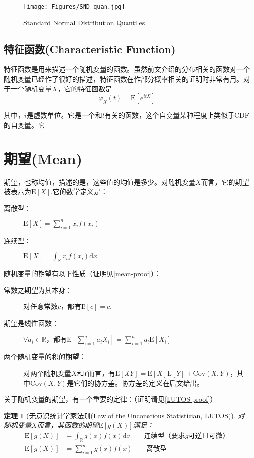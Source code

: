 \documentclass[UTF8]{ctexbook}
\newtheorem{theorem}{定理}[section] %
\begin{document}
\begin{figure}[ht]
	\centering
	\texttt{[image: Figures/SND\_quan.jpg]}
	\caption{Standard Normal Distribution Quantiles}
	\label{fig:StNor_quan}
\end{figure}

\newpage
\subsection{特征函数(Characteristic Function)}
\label{characteristic-function}
特征函数是用来描述一个随机变量的函数。虽然前文介绍的分布相关的函数对一个随机变量已经作了很好的描述，特征函数在作部分概率相关的证明时非常有用。对于一个随机变量$X$，它的特征函数是
\[
	\varphi_X(t)=\mathrm E[e^{itX}]
\]

其中，$i$是虚数单位。它是一个和$t$有关的函数，这个自变量某种程度上类似于CDF的自变量。它

\section{期望(Mean)}
\label{mean}
期望，也称均值，描述的是，这些值的均值是多少。对随机变量$X$而言，它的期望被表示为$\mathrm E[X]$.它的数学定义是：
\begin{description}
	\item [离散型：]
	$\mathrm E[X]=\sum_{i=1}^nx_if(x_i)$
	\item [连续型：]
	$\mathrm E[X]=\int_{\mathbb{R}}x_if(x_i)\mathrm dx$
\end{description}

随机变量的期望有以下性质（证明见\ref{mean-proof}）：
\begin{description}
	\item [常数之期望为其本身：]
	对任意常数$c$，都有$\mathrm E[c]=c$.
	\item [期望是线性函数：]
	$\forall a_i\in\mathbb{R}$，都有$\mathrm E[\sum_{i=1}^na_iX_i]=\sum_{i=1}^na_i\mathrm E[X_i]$
	\item [两个随机变量的积的期望：]
	对两个随机变量$X$和$Y$而言，有$\mathrm E[XY]=\mathrm E[X]\mathrm E[Y]+\mathrm{Cov}(X,Y)$，其中$\mathrm{Cov}(X,Y)$是它们的协方差。协方差的定义在后文给出。
\end{description}

关于随机变量的期望，有一个重要的定律：（证明请见\ref{LUTOS-proof}）
\begin{theorem}[无意识统计学家法则(Law of the Unconscious Statistician, LUTOS)]
\label{theorem:LUTOS}
	对随机变量$X$而言，其函数的期望$\mathrm E[g(X)]$满足：
	\begin{align*}
		\mathrm E[g(X)]&=\int_{\mathbb{R}}g(x)f(x)\mathrm dx\qquad\text{连续型（要求$g$可逆且可微）} \\
		\mathrm E[g(X)]&=\sum_{i=1}^ng(x)f(x)\qquad\text{离散型}
	\end{align*}
\end{theorem}
\end{document}
